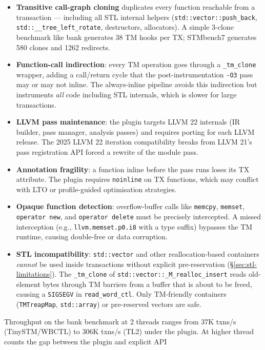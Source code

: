 \documentclass[article,12pt]{article}
\begin{document}
\begin{itemize}
\item \textbf{Transitive call-graph cloning} duplicates every function reachable
  from a transaction --- including all STL internal helpers
  (\texttt{std::vector::push\_back}, \texttt{std::\_\_tree\_left\_rotate},
  destructors, allocators).  A simple 3-clone benchmark like bank generates 38
  TM hooks per TX; STMbench7 generates 580 clones and 1262 redirects.
\item \textbf{Function-call indirection}: every TM operation goes through a
  \texttt{\_tm\_clone} wrapper, adding a call/return cycle that the post-instrumentation
  \texttt{-O3} pass may or may not inline.  The always-inline pipeline avoids
  this indirection but instruments \emph{all} code including STL internals,
  which is slower for large transactions.
\item \textbf{LLVM pass maintenance}: the plugin targets LLVM 22 internals
  (IR builder, pass manager, analysis passes) and requires porting for each
  LLVM release.  The 2025 LLVM 22 iteration compatibility breaks from LLVM 21's
  pass registration API forced a rewrite of the module pass.
\item \textbf{Annotation fragility}: a function inline before the pass runs
  loses its TX attribute.  The plugin requires \texttt{noinline} on TX
  functions, which may conflict with LTO or profile-guided optimisation
  strategies.
\item \textbf{Opaque function detection}: overflow-buffer calls like
  \texttt{memcpy}, \texttt{memset}, \texttt{operator new}, and
  \texttt{operator delete} must be precisely intercepted.  A missed
  interception (e.g., \texttt{llvm.memset.p0.i8} with a type suffix)
  bypasses the TM runtime, causing double-free or data corruption.
\item \textbf{STL incompatibility}: \texttt{std::vector} and other
  reallocation-based containers \emph{cannot} be used inside transactions
  without explicit pre-reservation (\S\ref{sec:stl-limitations}).
  The \texttt{\_tm\_clone} of \texttt{std::vector::\_M\_realloc\_insert}
  reads old-element bytes through TM barriers from a buffer that is about
  to be freed, causing a \texttt{SIGSEGV} in \texttt{read\_word\_ctl}.
  Only TM-friendly containers (\texttt{TMTreapMap}, \texttt{std::array})
  or pre-reserved vectors are safe.
\end{itemize}
Throughput on the bank benchmark at 2 threads ranges from 37K txns/s
(TinySTM/WBCTL) to 306K txns/s (TL2) under the plugin.
At higher thread counts the gap between the plugin and explicit API
\end{document}
